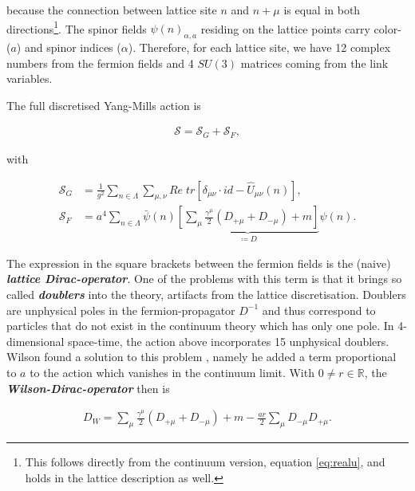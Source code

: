 \documentclass{article}
\theoremstyle{plain} %
\theoremstyle{convention} %
\theoremstyle{remark} %
\def\df#1{\textbf{\textit{#1}}}
\numberwithin{equation}{section}
\begin{document}
because the connection between lattice site $n$ and $n + \mu$ is equal in both directions\footnote{This follows directly from the continuum version, equation \eqref{eq:realu}, and holds in the lattice description as well.}. The spinor fields $\psi(n)_{\alpha,a}$ residing on the lattice points carry color- ($a$) and spinor indices ($\alpha$). Therefore, for each lattice site, we have \num{12} complex numbers from the fermion fields and \num{4} $SU(3)$ matrices coming from the link variables.

The full discretised Yang-Mills action is

\begin{align*}
    \mathcal{S} = \mathcal{S}_G + \mathcal{S}_F,
\end{align*}

with

\begin{align*}
    \mathcal{S}_G &= \frac{1}{g^2} \sum_{n \in \Lambda} \sum_{\mu, \nu} Re \; tr\left[ \delta_{\mu \nu} \cdot id - \hat{U}_{\mu \nu}(n) \right], \\
    \mathcal{S}_F &= a^4 \sum_{n \in \Lambda} \bar{\psi}(n) \underbrace{\left[ \sum_{\mu} \frac{\gamma^{\mu}}{2} (D_{+\mu} + D_{-\mu}) + m \right]}_{\coloneqq D} \psi(n).
\end{align*}

The expression in the square brackets between the fermion fields is the (naive) \df{lattice Dirac-operator}. One of the problems with this term is that it brings so called \df{doublers} into the theory, artifacts from the lattice discretisation. Doublers are unphysical poles in the fermion-propagator $D^{-1}$ and thus correspond to particles that do not exist in the continuum theory which has only one pole. In 4-dimensional space-time, the action above incorporates \num{15} unphysical doublers\footnotemark. Wilson found a solution to this problem \cite{wilson1974}, namely he added a term proportional to $a$ to the action which vanishes in the continuum limit. With $0 \ne r \in \mathbb{R}$, the \df{Wilson-Dirac-operator} then is


\begin{align}
    D_W = \sum_{\mu} \frac{\gamma^{\mu}}{2} (D_{+\mu} + D_{-\mu}) + m - \frac{a r}{2} \sum_{\mu} D_{-\mu} D_{+\mu}. \label{eq:dwop}
\end{align}
\end{document}
